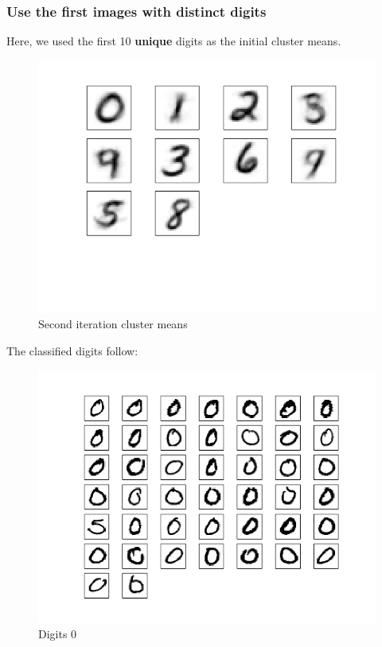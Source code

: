 \documentclass[10pt]{article}
\begin{document}
\subsubsection{Use the first images with \textbf{distinct} digits}
Here, we used the first 10 \textbf{unique} digits as the initial cluster means.
\begin{figure}[H]
\begin{center}
\includegraphics[scale=0.5]{meansB}
\caption{Second iteration cluster means}
\end{center}
\end{figure}
The classified digits follow:
\begin{figure}
\begin{center}
\includegraphics[scale=0.5]{meansB0}
\caption{Digits 0}
\end{center}
\end{figure}
\end{document}
